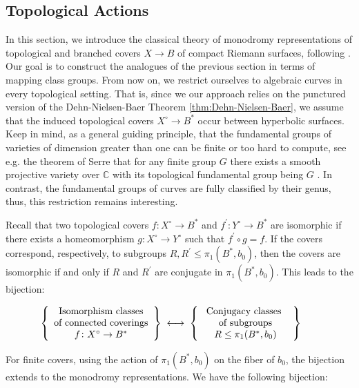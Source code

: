\documentclass[10pt]{amsart}
\theoremstyle{definition}
\begin{document}
\subsection{Topological Actions}
In this section, we introduce the classical theory of monodromy representations of topological and branched covers $X\rightarrow B$ of compact Riemann surfaces, following \cite[Ch. 3.4]{MR1326604}. Our goal is to construct the analogues of the previous section in terms of mapping class groups. From now on, we restrict ourselves to algebraic curves in every topological setting. 
That is, since we our approach relies on the punctured version of the Dehn-Nielsen-Baer Theorem \ref{thm:Dehn-Nielsen-Baer}, we assume that the induced topological covers $X^\circ \rightarrow B^*$ occur between hyperbolic surfaces. Keep in mind, as a general guiding principle, that the fundamental groups of varieties of dimension greater than one can be finite or too hard to compute, see e.g. the theorem of Serre that for any finite group $G$ there exists a smooth projective variety over $\mathbb{C}$ with its topological fundamental group being $G$ \cite[Prop. 15]{SerreMexico}. In contrast, the fundamental groups of curves are fully classified by their genus, thus, this restriction remains interesting.

Recall that two topological covers $f\colon X^\circ \rightarrow B^*$ and $ f^\prime \colon Y^\circ \rightarrow B^*$ are isomorphic if there exists a homeomorphism $g \colon X^\circ \rightarrow Y^\circ$ such that $f^\prime \circ g = f$. If the covers correspond, respectively, to subgroups $R, R^\prime \leq \pi_1(B^*,b_0)$, then the covers are isomorphic if and only if $R$ and $R^\prime$ are conjugate in $\pi_1(B^*, b_0)$. This leads to the bijection:

\[
\left\{
\begin{array}{c}
\text{Isomorphism classes}  \\
\text{of connected coverings} \\
f\colon X^\circ \to B^*
\end{array}
\right\}
\; \longleftrightarrow \;
\left\{
\begin{array}{c}
\text{\  Conjugacy classes \ } \\
\text{ of subgroups } \\
R \leq \pi_1(B^*, b_0)
\end{array}
\right\} \hspace{0.6 cm}
\]


\vspace{0.3 cm}
For finite covers, using the action of $\pi_1(B^*,b_0)$ on the fiber of $b_0$, the bijection extends to the monodromy representations. We have the following bijection:
\end{document}
